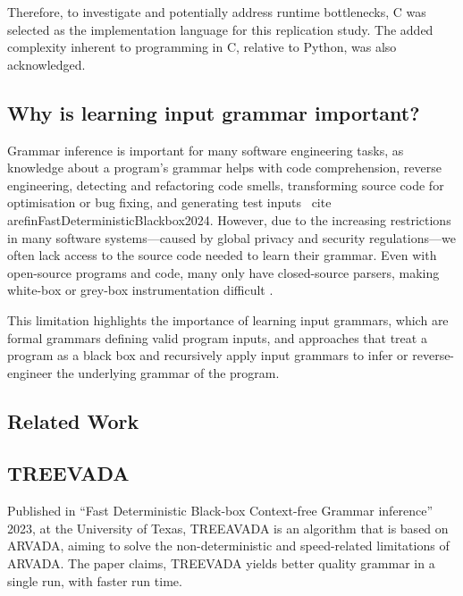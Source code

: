 \vspace{\baselineskip}

Therefore, to investigate and potentially address runtime bottlenecks, C was selected as the implementation language for this replication study. The added complexity inherent to programming in C, relative to Python, was also acknowledged.

\subsection{Why is learning input grammar important?}
Grammar inference is important for many software engineering tasks, as knowledge about a program's grammar helps with code comprehension, reverse engineering, detecting and refactoring code smells, transforming source code for optimisation or bug fixing, and generating test inputs \ cite {arefinFastDeterministicBlackbox2024}. However, due to the increasing restrictions in many software systems—caused by global privacy and security regulations—we often lack access to the source code needed to learn their grammar.  Even with open-source programs and code, many only have closed-source parsers, making white-box or grey-box instrumentation difficult \cite{arefinFastDeterministicBlackbox2024,liIncrementalContextfreeGrammar2024}.

\vspace{\baselineskip}
This limitation highlights the importance of learning input grammars, which are formal grammars defining valid program inputs, and approaches that treat a program as a black box and recursively apply input grammars to infer or reverse-engineer the underlying grammar of the program.


\subsection{Related Work}

\subsection{TREEVADA}

Published in \enquote{Fast Deterministic Black-box Context-free Grammar inference} 2023, at the University of Texas\cite{arefinFastDeterministicBlackbox2024}, TREEAVADA is an algorithm that is based on ARVADA\cite{kulkarniLearningHighlyRecursive2021}, aiming to solve the non-deterministic and speed-related limitations of ARVADA. The paper claims, TREEVADA yields better quality grammar in a single run, with faster run time.

